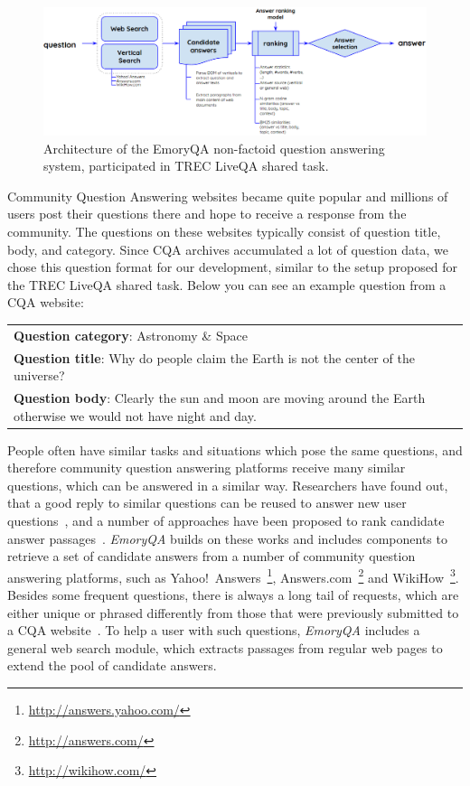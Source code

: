 \begin{figure}
    \includegraphics[width=\textwidth]{img/emoryqa_design}
    \caption{Architecture of the EmoryQA non-factoid question answering system, participated in TREC LiveQA shared task.}
    \label{figure:non-factoid:emoryqa}
\end{figure}

Community Question Answering websites became quite popular and millions of users post their questions there and hope to receive a response from the community.
The questions on these websites typically consist of question title, body, and category.
Since CQA archives accumulated a lot of question data, we chose this question format for our development, similar to the setup proposed for the TREC LiveQA shared task.
Below you can see an example question from a CQA website:

\begin{center}
\begin{tabular}{|p{12cm}|}
\hline
\textbf{Question category}: Astronomy \& Space\\
\textbf{Question title}: Why do people claim the Earth is not the center of the universe?\\
\textbf{Question body}: Clearly the sun and moon are moving around the Earth otherwise we would not have night and day.\\
\hline
\end{tabular}
\end{center}

People often have similar tasks and situations which pose the same questions, and therefore community question answering platforms receive many similar questions, which can be answered in a similar way.
Researchers have found out, that a good reply to similar questions can be reused to answer new user questions~\cite{carmel2000eresponder,Shtok:2012:LPA:2187836.2187939}, and a number of approaches have been proposed to rank candidate answer passages~\cite{fried2015higher,sharp2015spinning,soricut2006automatic,surdeanu2011learning,yang2016beyond}.
\textit{EmoryQA} builds on these works and includes components to retrieve a set of candidate answers from a number of community question answering platforms, such as Yahoo!~Answers~\footnote{\href{url}{http://answers.yahoo.com/}}, Answers.com~\footnote{\href{url}{http://answers.com/}} and WikiHow~\footnote{\href{url}{http://wikihow.com/}}.
Besides some frequent questions, there is always a long tail of requests, which are either unique or phrased differently from those that were previously submitted to a CQA website~\cite{bernstein2012direct}.
To help a user with such questions, \textit{EmoryQA} includes a general web search module, which extracts passages from regular web pages to extend the pool of candidate answers.

